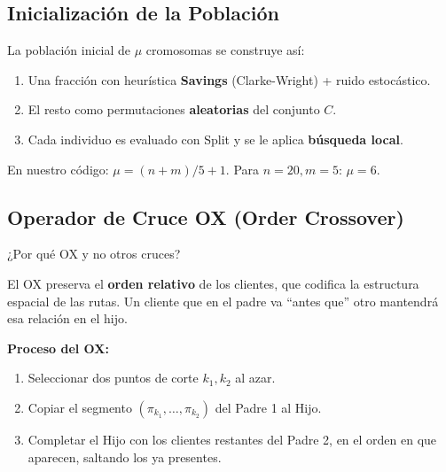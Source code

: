 \documentclass[12pt,a4paper]{article}
\begin{document}
\subsection{Inicialización de la Población}

La población inicial de $\mu$ cromosomas se construye así:
\begin{enumerate}
\item Una fracción con heurística \textbf{Savings} (Clarke-Wright) + ruido estocástico.
\item El resto como permutaciones \textbf{aleatorias} del conjunto $C$.
\item Cada individuo es evaluado con Split y se le aplica \textbf{búsqueda local}.
\end{enumerate}

En nuestro código: $\mu = (n+m)/5 + 1$. Para $n=20, m=5$: $\mu=6$.

\subsection{Operador de Cruce OX (Order Crossover)}

\begin{pregunta}
¿Por qué OX y no otros cruces?
\end{pregunta}

El OX preserva el \textbf{orden relativo} de los clientes, que codifica la estructura espacial de las rutas. Un cliente que en el padre va ``antes que'' otro mantendrá esa relación en el hijo.

\textbf{Proceso del OX:}
\begin{enumerate}
\item Seleccionar dos puntos de corte $k_1, k_2$ al azar.
\item Copiar el segmento $(\pi_{k_1}, \ldots, \pi_{k_2})$ del Padre 1 al Hijo.
\item Completar el Hijo con los clientes restantes del Padre 2, en el orden en que aparecen, saltando los ya presentes.
\end{enumerate}
\end{document}
